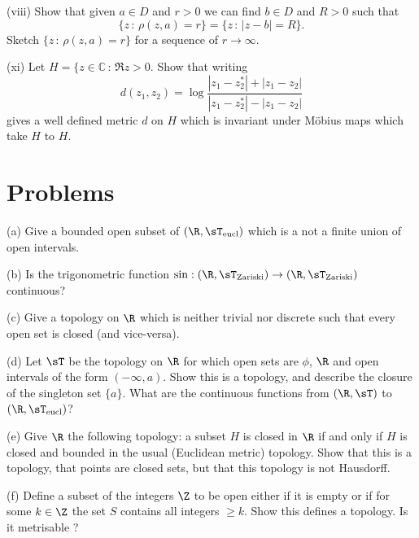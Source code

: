 \begin{problem}

(viii) Show that given $a\in D$ and $r>0$
we can find $b\in D$ and $R>0$ such that
\[\{z\,:\,\rho(z,a)=r\}=\{z\,:\,|z-b|=R\}.\]
Sketch $\{z\,:\,\rho(z,a)=r\}$ for a sequence of $r\rightarrow\infty$.

(xi) Let $H=\{z\in{\mathbb C}\,:\,\Re z>0$. Show that
writing
\[d(z_{1},z_{2})=
\log\frac{|z_{1}-z_{2}^{*}|+|z_{1}-z_{2}|}{|z_{1}-z_{2}^{*}|-|z_{1}-z_{2}|}\]
gives a well defined metric $d$
on $H$ which is invariant under
M\"{o}bius maps which take $H$ to $H$.
\end{problem}


\section{Problems}

\begin{problem}
\ben
\item [(a)] Give a bounded open subset of $(\R, \sT_{\text{eucl}})$ which is a not a finite union of open intervals.
\item [(b)] Is the trigonometric function $\sin : (\R, \sT_{\text{Zariski}}) \to (\R, \sT_{\text{Zariski}})$ continuous?
\item [(c)] Give a topology on $\R$ which is neither trivial nor discrete such that every open set is closed (and vice-versa).
\item [(d)] Let $\sT$ be the topology on $\R$ for which open sets are $\phi$, $\R$ and open intervals of the form $(-\infty, a)$. Show this is a topology, and describe the closure of the singleton set $\{a\}$. What are the continuous functions from $(\R,\sT)$ to $(\R, \sT_{\text{eucl}})$?
\item [(e)] Give $\R$ the following topology: a subset $H$ is closed in $\R$ if and only if $H$ is closed and bounded in the usual (Euclidean metric) topology. Show that this is a topology, that points are closed sets, but that this topology is not Hausdorff.
\item [(f)] Define a subset of the integers $\Z$ to be open either if it is empty or if for some $k \in \Z$ the set $S$ contains all integers $\geq k$. Show this defines a topology. Is it metrisable ?
\een
\end{problem}

